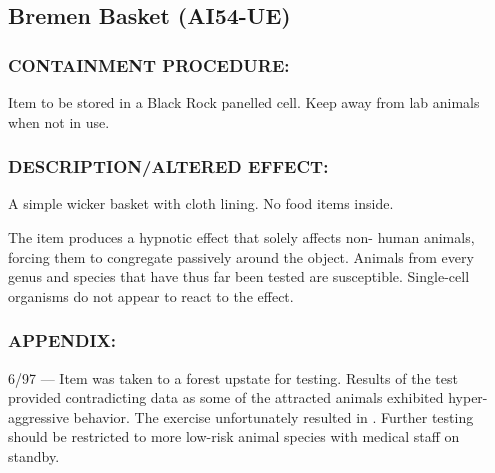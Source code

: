\subsection*{Bremen Basket (AI54-UE)}
\subsubsection*{CONTAINMENT PROCEDURE:}
\par Item to be stored in a Black Rock
panelled cell. Keep away from lab
animals when not in use.
\subsubsection*{DESCRIPTION/ALTERED EFFECT:}
\par A simple wicker basket with cloth lining.
No food items inside.
\par The item produces a hypnotic effect that solely affects non-
human animals, forcing them to congregate passively around the
object. Animals from every genus and species that have thus far
been tested are susceptible. Single-cell organisms do not appear
to react to the effect.
\subsubsection*{APPENDIX:}
\par 6/97 — Item was taken to a forest upstate for testing. Results of
the test provided contradicting data as some of the attracted
animals exhibited hyper-aggressive behavior. The exercise
unfortunately resulted in  .
Further testing should be restricted to more low-risk animal
species with medical staff on standby.